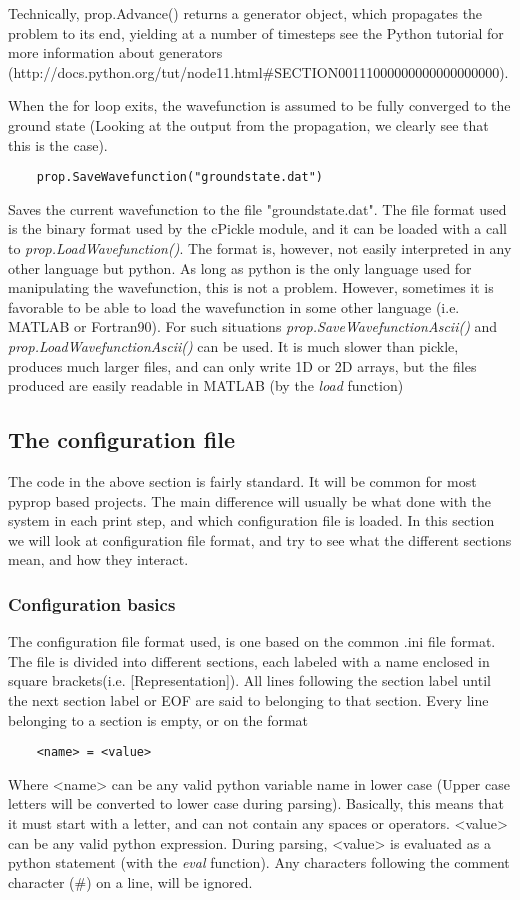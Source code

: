 \documentclass[a4paper,12pt]{report}
\begin{document}
Technically, prop.Advance() returns a generator object, which propagates the problem to its end, yielding at a number of 
timesteps see the Python tutorial for more information about generators
(http://docs.python.org/tut/node11.html\#SECTION00111000000000000000000).

When the for loop exits, the wavefunction is assumed to be fully converged to the ground state (Looking at the output
from the propagation, we clearly see that this is the case). 
\begin{verbatim}	
	prop.SaveWavefunction("groundstate.dat")
\end{verbatim}
Saves the current wavefunction to the file "groundstate.dat". The file format used is the binary format used
by the cPickle module, and it can be loaded with a call to \textit{prop.LoadWavefunction()}. The format is, however, not 
easily interpreted in any other language but python. As long as python is the only language used for manipulating the 
wavefunction, this is not a problem. However, sometimes it is favorable to be able to load the wavefunction in some
other language (i.e. MATLAB or Fortran90). For such situations \textit{prop.SaveWavefunctionAscii()} and
\textit{prop.LoadWavefunctionAscii()}
can be used. It is much slower than pickle, produces much larger files, and can only write 1D or 2D arrays, but the files
produced are easily readable in MATLAB (by the \textit{load} function)

\subsection{The configuration file}
The code in the above section is fairly standard. It will be common for most pyprop based projects. The main difference
will usually be what done with the system in each print step, and which configuration file is loaded. In this section we 
will look at configuration file format, and try to see what the different sections mean, and how they interact.

\subsubsection*{Configuration basics}
The configuration file format used, is one based on the common .ini file format. The file is divided into different
sections, each labeled with a name enclosed in square brackets(i.e. [Representation]). All lines following the section
label until the next section label or EOF are said to belonging to that section. Every line belonging to a section is
empty, or on the format 
\begin{verbatim}
	<name> = <value>
\end{verbatim}
Where <name> can be any valid python variable name in lower case (Upper case letters will be converted to lower case during
parsing). Basically, this means that it must start with a letter, and can not contain any spaces or operators. 
<value> can be any valid python expression. During parsing, <value> is evaluated as a python statement 
(with the \textit{eval} function). Any characters following the comment character (\#) on a line, will be ignored.
\end{document}
